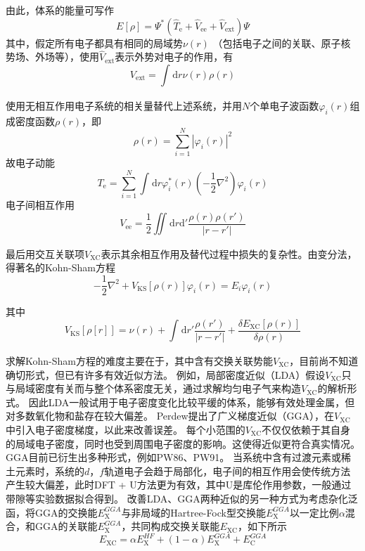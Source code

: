 由此，体系的能量可写作
\begin{equation}
    E[\rho] = \Psi ^*(\hat{T}_{\mathrm{e}}+\hat{V}_{\mathrm{ee}}+\hat{V}_{\mathrm{ext}})\Psi
\end{equation}
其中，假定所有电子都具有相同的局域势$\nu (r)$ （包括电子之间的关联、原子核势场、外场等），使用$\hat{V}_{\mathrm{ext}}$表示外势对电子的作用，有
\begin{equation}
    V_{\mathrm{ext}} = \int_{}^{}\mathrm{d}r\nu(r)\rho(r)
\end{equation}

使用无相互作用电子系统的相关量替代上述系统，并用$N$个单电子波函数$ \varphi _i(r) $组成密度函数$\rho(r)$，即
\begin{equation}
    \rho(r)=\sum_{i=1}^{N}|\varphi_i (r)|^2
\end{equation}
故电子动能
\begin{equation}
    T_{\mathrm{e}}=\sum_{i=1}^{N}\int_{}^{}\mathrm{d}r\varphi^*_i(r)(-\frac{1}{2}\nabla^2)\varphi_i(r)
\end{equation}
电子间相互作用
\begin{equation}
    V_{\mathrm{ee}} =\frac{1}{2}\iint_{}^{}\mathrm{d}r\mathrm{d'}\frac{\rho(r)\rho(r')}{|r-r'|}
\end{equation}

最后用交互关联项$V_{\mathrm{XC}}$表示其余相互作用及替代过程中损失的复杂性。由变分法，得著名的Kohn-Sham方程
\begin{equation}
    {-\frac{1}{2}\nabla^2+V_{\mathrm{KS}}[\rho(r)]}\varphi_i(r)=E_i\varphi_i(r)
\end{equation}

其中
\begin{equation}
    V_{\mathrm{KS}}[\rho[r]]=\nu(r)+\int_{}^{}\mathrm{d}r'\frac{\rho(r')}{|r-r'|}+\frac{\delta E_{\mathrm{XC}}[\rho(r)]}{\delta\rho(r)}
\end{equation}

求解Kohn-Sham方程的难度主要在于，其中含有交换关联势能$V_{\mathrm{XC}}$，目前尚不知道确切形式，但已有许多有效近似方法。
例如，局部密度近似（LDA）假设$V_{\mathrm{XC}}$只与局域密度有关而与整个体系密度无关，通过求解均匀电子气来构造$V_{\mathrm{XC}}$的解析形式。
因此LDA一般试用于电子密度变化比较平缓的体系，能够有效处理金属，但对多数氧化物和盐存在较大偏差。
Perdew提出了广义梯度近似（GGA），在$V_{\mathrm{XC}}$中引入电子密度梯度，以此来改善误差。
每个小范围的$V_{\mathrm{XC}}$不仅仅依赖于其自身的局域电子密度，同时也受到周围电子密度的影响。这使得近似更符合真实情况。
GGA目前已衍生出多种形式，例如PW86、PW91。
当系统中含有过渡元素或稀土元素时，系统的$d$，$f$轨道电子会趋于局部化，电子间的相互作用会使传统方法产生较大偏差，此时DFT + U方法更为有效，其中U是库伦作用参数，一般通过带隙等实验数据拟合得到。
改善LDA、GGA两种近似的另一种方式为考虑杂化泛函，将GGA的交换能$E^{GGA}_{\mathrm{X}}$与非局域的Hartree-Fock型交换能$E^{GGA}_{\mathrm{X}}$以一定比例$\alpha$混合，和GGA的关联能$E^{GGA}_{\mathrm{X}}$，共同构成交换关联能$E_{\mathrm{XC}}$，如下所示
\begin{equation}
    E_{\mathrm{XC}}=\alpha E^{HF}_{\mathrm{X}}+(1-\alpha)E^{GGA}_{\mathrm{X}}+E^{GGA}_{\mathrm{C}}
\end{equation}

